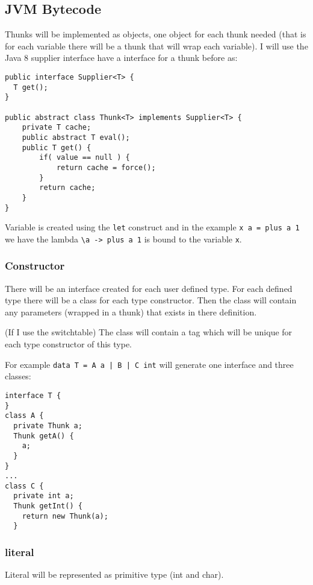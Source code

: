 \documentclass[12pt,a4paper,twoside]{article}
\begin{document}
\subsection{JVM Bytecode}

Thunks will be implemented as objects, one object for each thunk needed 
(that is for each variable there will be a thunk that will wrap each variable).
I will use the Java 8 supplier interface have a interface for a thunk before as:


\begin{verbatim}
public interface Supplier<T> {
  T get();
}

public abstract class Thunk<T> implements Supplier<T> {
    private T cache;
    public abstract T eval();
    public T get() {
        if( value == null ) {
            return cache = force();
        }
        return cache;
    }
}
\end{verbatim}

Variable is created using the \texttt{let} construct and in the example \texttt{x a = plus a 1} we have
the lambda \texttt{\textbackslash a -> plus a 1} is bound to the variable \texttt{x}.

\subsubsection{Constructor}

There will be an interface created for each user defined type. 
For each defined type there will be a class for each type constructor. 
Then the class will contain any parameters (wrapped in a thunk) that exists in there definition.

(If I use the switchtable)
The class will contain a tag which will be unique for each type constructor of this type.

For example \texttt{data T = A a | B | C int} will generate one interface and three classes:

\begin{verbatim}
interface T {
}
class A {
  private Thunk a;
  Thunk getA() {
    a;
  }
}
...
class C {
  private int a;
  Thunk getInt() {
    return new Thunk(a);
  }
\end{verbatim}

\subsubsection{literal}

Literal will be represented as primitive type (int and char).
\end{document}
